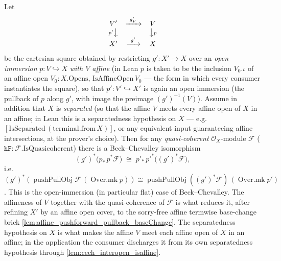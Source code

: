 \begin{lemma}

  \label{lem:openimm_beckchevalley}
  Let
  \[
    \begin{array}{ccc}
      V' & \xrightarrow{\ g'_V\ } & V\\
      {\scriptstyle p'}\big\downarrow & & \big\downarrow{\scriptstyle p}\\
      X' & \xrightarrow{\ g'\ } & X
    \end{array}
  \]
  be the cartesian square obtained by restricting \(g' : X' \to X\) over an \emph{open
  immersion} \(p : V \hookrightarrow X\) \emph{with \(V\) affine} (in Lean \(p\) is taken to be
  the inclusion \(V_0.\iota\) of an affine open \(V_0 : X.\mathrm{Opens}\),
  \(\mathrm{IsAffineOpen}\,V_0\) --- the form in which every consumer instantiates the square),
  so that \(p' : V' \hookrightarrow X'\) is again an open immersion (the pullback of \(p\) along
  \(g'\), with image the preimage \((g')^{-1}(V)\)). Assume in addition that \(X\) is
  \emph{separated} (so that the affine \(V\) meets every affine open of \(X\) in an affine;
  in Lean this is a separatedness hypothesis on \(X\) --- e.g.\ \([\mathrm{IsSeparated}\,
  (\mathrm{terminal.from}\,X)]\), or any equivalent input guaranteeing affine
  intersections, at the prover's choice). Then for any \emph{quasi-coherent}
  \(\mathcal{O}_X\)-module \(\mathcal{F}\) (\(\mathtt{hF} : \mathcal{F}.\mathrm{IsQuasicoherent}\))
  there is a Beck--Chevalley isomorphism
  \[
    (g')^*\bigl(p_*\,p^*\mathcal{F}\bigr)
      \;\cong\;
    p'_*\,p'^*\bigl((g')^*\mathcal{F}\bigr),
  \]
  i.e.\ \((g')^*(\operatorname{pushPullObj}\mathcal{F}\,(\operatorname{Over.mk} p)) \cong
  \operatorname{pushPullObj}((g')^*\mathcal{F})\,(\operatorname{Over.mk} p')\). This is the
  open-immersion (in particular flat) case of Beck--Chevalley. The affineness of \(V\)
  together with the quasi-coherence of \(\mathcal{F}\) is what reduces it, after refining
  \(X'\) by an affine open cover, to the sorry-free affine termwise base-change brick
  \cref{lem:affine_pushforward_pullback_baseChange}. The separatedness hypothesis on \(X\) is
  what makes the affine \(V\) meet each affine open of \(X\) in an affine; in the application
  the consumer discharges it from its own separatedness hypothesis through
  \cref{lem:cech_interopen_isaffine}.
\end{lemma}
